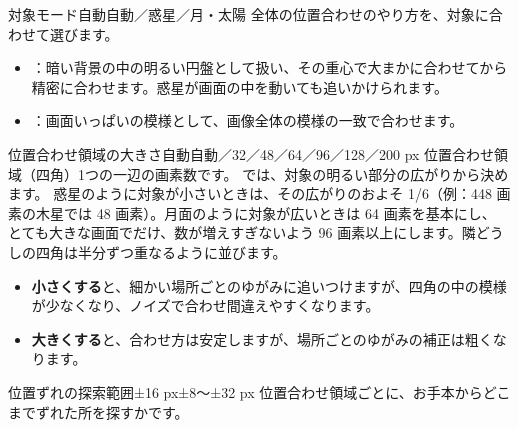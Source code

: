 \begin{setting}{ 対象モード}{自動}{自動／惑星／月・太陽}
  全体の位置合わせのやり方を、対象に合わせて選びます。
  \begin{itemize}[itemsep=0pt, topsep=2pt]
    \item {}：暗い背景の中の明るい円盤として扱い、その重心で大まかに合わせてから精密に合わせます。惑星が画面の中を動いても追いかけられます。
    \item {}：画面いっぱいの模様として、画像全体の模様の一致で合わせます。
  \end{itemize}
\end{setting}

\begin{setting}{ 位置合わせ領域の大きさ}{自動}{自動／32／48／64／96／128／200 px}
  位置合わせ領域（四角）1つの一辺の画素数です。 では、対象の明るい部分の広がりから決めます。
  惑星のように対象が小さいときは、その広がりのおよそ 1/6（例：448 画素の木星では 48 画素）。月面のように対象が広いときは 64 画素を基本にし、
  とても大きな画面でだけ、数が増えすぎないよう 96 画素以上にします。隣どうしの四角は半分ずつ重なるように並びます。
  \begin{itemize}[itemsep=0pt, topsep=2pt]
    \item \textbf{小さくする}と、細かい場所ごとのゆがみに追いつけますが、四角の中の模様が少なくなり、ノイズで合わせ間違えやすくなります。
    \item \textbf{大きくする}と、合わせ方は安定しますが、場所ごとのゆがみの補正は粗くなります。
  \end{itemize}
\end{setting}

\begin{setting}{ 位置ずれの探索範囲}{±16 px}{±8〜±32 px}
  位置合わせ領域ごとに、お手本からどこまでずれた所を探すかです。
\end{setting}

